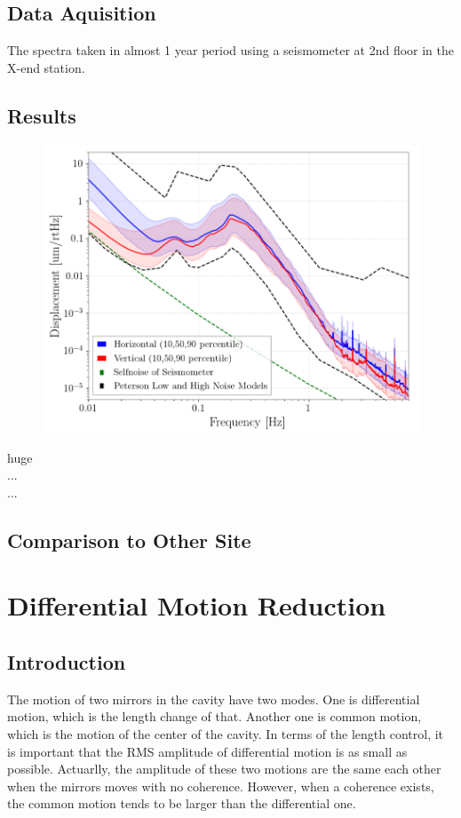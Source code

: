 \subsection{Data Aquisition}



The spectra taken in almost 1 year period using a seismometer at 2nd floor in the X-end station. 


\subsection{Results}
\begin{figure}[H]
  \begin{center}   
    \includegraphics[width=12.0cm]{./img_chap3/img313.png}
    \caption{}
  \end{center}
\end{figure}


huge
\\
...\\
...\\


\subsection{Comparison to Other Site}

\section{Differential Motion Reduction}
\subsection{Introduction}
The motion of two mirrors in the cavity have two modes. One is differential motion, which is the length change of that. Another one is common motion, which is the motion of the center of the cavity. In terms of the length control, it is important that the RMS amplitude of differential motion is as small as possible. Actuarlly, the amplitude of these two motions are the same each other when the mirrors moves with no coherence. However, when a coherence exists, the common motion tends to be larger than the differential one. 


